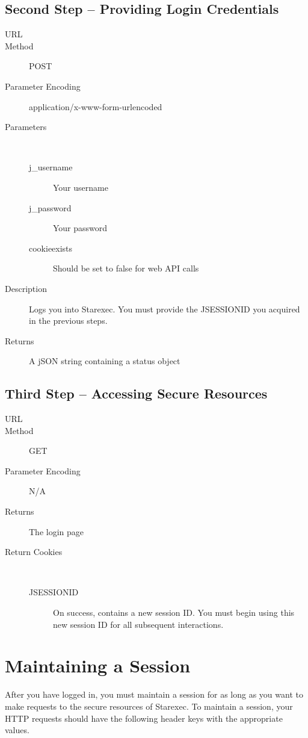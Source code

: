 \subsection{Second Step -- Providing Login Credentials}

\begin{description}
\item [URL] 
\item [Method] POST
\item [Parameter Encoding] application/x-www-form-urlencoded
\item [Parameters] \
    \begin{description}
    \item [j\_username]  Your username
    \item [j\_password] \type{String} Your password
    \item [cookieexists]  Should be set to false for web API calls
    \end{description}

\item [Description] Logs you into Starexec. You must provide the JSESSIONID you acquired in the previous steps.
\item [Returns] A jSON string containing a status object
\end{description}

\subsection{Third Step -- Accessing Secure Resources}

\begin{description}
\item [URL] 
\item [Method] GET
\item [Parameter Encoding] N/A
\item [Returns] The login page
\item [Return Cookies] \
	\begin{description}
	\item [JSESSIONID]  On success, contains a new session ID. You must begin using this new session ID for all subsequent interactions.
	\end{description}
\end{description}

\section{Maintaining a Session}
After you have logged in, you must maintain a session for as long as you want to make requests to the secure resources of Starexec. To maintain a session, your HTTP requests should have the following header keys with the appropriate values.

